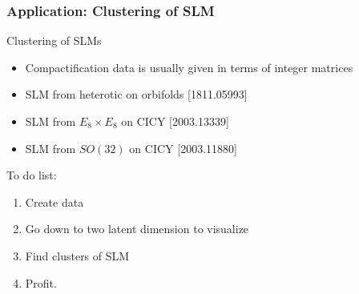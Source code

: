 \documentclass{beamer}
\newcommand{\bi}{\begin{itemize}}
\newcommand{\ei}{\end{itemize}}
\begin{document}
\begin{frame}
\frametitle{Application: Clustering of SLM}
Clustering of SLMs
\bi
\item Compactification data is usually given in terms of integer matrices
\item SLM from heterotic on orbifolds {\color{blue} [1811.05993]}
\item SLM from $E_8 \times E_8$ on CICY {\color{blue} [2003.13339]}
\item SLM from $SO(32)$ on CICY {\color{blue} [2003.11880]}
\ei
\pause 
To do list:
\begin{enumerate}
\item Create data
\item Go down to two latent dimension to visualize
\item Find clusters of SLM
\item Profit.
\end{enumerate}
\end{frame}
\end{document}
